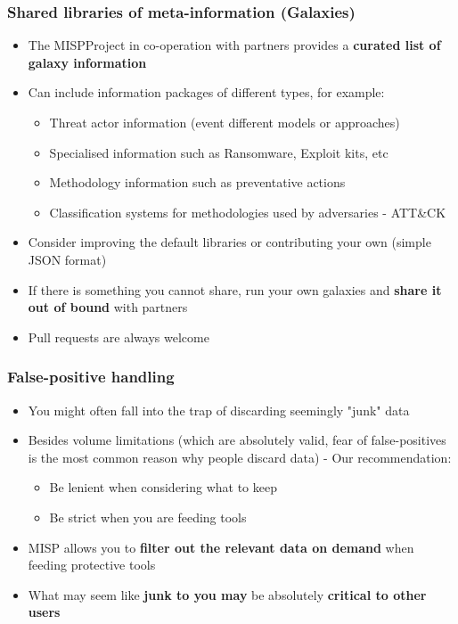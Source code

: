 \begin{frame}
\frametitle{Shared libraries of meta-information (Galaxies)}
\begin{itemize}
    \item The MISPProject in co-operation with partners provides a {\bf curated list of galaxy information}
	\item Can include information packages of different types, for example:
	\begin{itemize}
        \item Threat actor information (event different models or approaches)
		\item Specialised information such as Ransomware, Exploit kits, etc
		\item Methodology information such as preventative actions
		\item Classification systems for methodologies used by adversaries - ATT\&CK
	\end{itemize}
	\item Consider improving the default libraries or contributing your own (simple JSON format)
    \item If there is something you cannot share, run your own galaxies and {\bf share it out of bound} with partners
	\item Pull requests are always welcome
\end{itemize}
\end{frame}

\begin{frame}
\frametitle{False-positive handling}
\begin{itemize}
	\item You might often fall into the trap of discarding seemingly "junk" data
	\item Besides volume limitations (which are absolutely valid, fear of false-positives is the most common reason why people discard data) - Our recommendation:
	\begin{itemize}
		\item Be lenient when considering what to keep
		\item Be strict when you are feeding tools
	\end{itemize}
\item MISP allows you to {\bf filter out the relevant data on demand} when feeding protective tools
\item What may seem like {\bf junk to you may} be absolutely {\bf critical to other users}
\end{itemize}
\end{frame}

